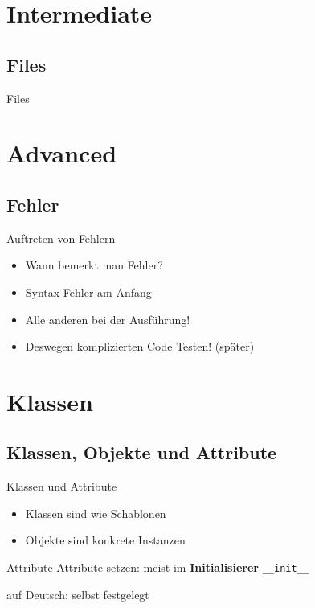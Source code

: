 \section{Intermediate}

\subsection{Files}
\begin{frame}{Files}
	
	
\end{frame}

\section{Advanced}
\subsection{Fehler}
\begin{frame}{Auftreten von Fehlern}
	\begin{itemize}
		\item Wann bemerkt man Fehler?
		\item<2-> Syntax-Fehler am Anfang
		\item<3-> Alle anderen bei der Ausführung!
		\item<4-> Deswegen komplizierten Code Testen! (später)
	\end{itemize}
\end{frame}

\section{Klassen}
\subsection{Klassen, Objekte und Attribute}
\begin{frame}{Klassen und Attribute}
	\begin{itemize}
		\item<1-> Klassen sind wie Schablonen
		\item<2-> Objekte sind konkrete Instanzen
	\end{itemize}
\end{frame}

\begin{frame}{Attribute}
	Attribute setzen: meist im \textbf{Initialisierer} \alert{\tt \_\_init\_\_}
	
	auf Deutsch: selbst festgelegt
\end{frame}

